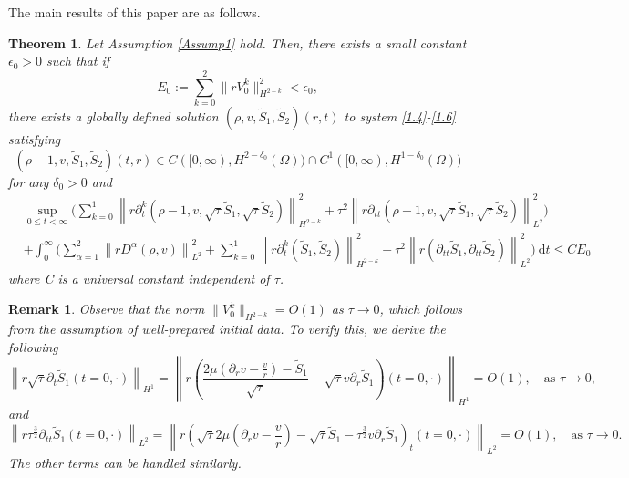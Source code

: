 \documentclass[10pt,reqno]{amsart}
\numberwithin{equation}{section}
\newtheorem{theorem}{Theorem}[section]
\newtheorem{remark}{Remark}[section]
\begin{document}
	
	The main results of this paper are as follows.
	\begin{theorem}\label{thm1}
		Let Assumption \eqref{Assump1} hold. Then, there exists a small constant $\epsilon_0>0$ such that if
		\begin{equation}
			E_0:= \sum_{k=0}^2\|rV_0^k\|_{H^{2-k}}^2<\epsilon_0,
		\end{equation}
		there exists a globally defined solution $(\rho,v,\tilde{S}_1,\tilde{S}_2)(r,t)$ to system \eqref{1.4}-\eqref{1.6} satisfying
		$$(\rho-1,v,\tilde{S}_1,\tilde{S}_2)(t,r)\in C([0,\infty),H^{2-\delta_0}(\Omega))\cap C^1([0,\infty),H^{1-\delta_0}(\Omega)) $$
		for any $\delta_0>0$ and 
		\begin{equation}\label{1.8}
			\begin{aligned}
				&\sup _{0 \leq t < \infty}\bigg( \sum_{k=0}^1\left\|r\partial_{t}^k(\rho-1, v, \sqrt{\tau} \tilde{S}_1, \sqrt{\tau} \tilde{S}_2)\right\|_{H^{2-k}}^2
				+\tau^2\left\|r\partial_{tt}(\rho-1, v, \sqrt{\tau} \tilde{S}_1, \sqrt{\tau} \tilde{S}_2)\right\|_{L^{2}}^2\bigg)\\
				&+\int_{0}^{\infty}\bigg(\sum_{\alpha=1}^2\left\|r D^\alpha(\rho, v)\right\|_{L^2}^2
				+\sum_{k=0}^1\left\|r\partial_{t}^k(\tilde{S}_1, \tilde{S}_2)\right\|_{H^{2-k}}^2
				+\tau^2\left\|r(\partial_{tt}\tilde{S}_1,\partial_{tt}\tilde{S}_2)\right\|_{L^{2}}^2\bigg)\mathrm{~d} t
				\leq C E_0
			\end{aligned}
		\end{equation}
		where C is a universal constant independent of $\tau$.
	\end{theorem}
	
	\begin{remark} 
		Observe that the norm 
		\(\|V_0^k\|_{H^{2-k}} = O(1)\) as \(\tau \to 0\), which follows from the assumption of well-prepared initial data. To verify this, we derive the following
		\[
		\left\|r\sqrt{\tau}\partial_{t}\tilde{S}_1(t=0,\cdot)\right\|_{H^1} 
		= \left\|r\left(\frac{2\mu(\partial_{r}v-\frac{v}{r})-\tilde{S}_1}{\sqrt{\tau}}-\sqrt{\tau}v\partial_{r}\tilde{S}_1\right)(t=0,\cdot)\right\|_{H^1} 
		= O(1), \quad \text{as } \tau \to 0,
		\]
		and
		\[
		\left\|r\tau^{\frac{3}{2}}\partial_{tt}\tilde{S}_1(t=0,\cdot)\right\|_{L^2} 
		= \left\|r\left(\sqrt{\tau}2\mu(\partial_{r}v-\frac{v}{r})-\sqrt{\tau}\tilde{S}_1-\tau^{\frac{3}{2}}v\partial_{r}\tilde{S}_1\right)_t(t=0,\cdot)\right\|_{L^2} 
		=O(1), \quad \text{as } \tau \to 0.
		\]
		The other terms can be handled similarly.
	\end{remark}
	
\end{document}
